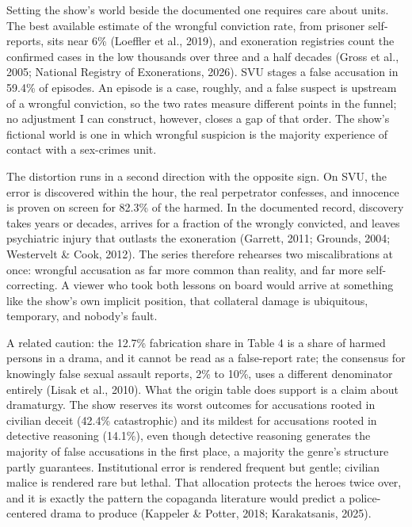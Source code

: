 \documentclass[
]{article}
\begin{document}
Setting the show's world beside the documented one requires care about
units. The best available estimate of the wrongful conviction rate, from
prisoner self-reports, sits near 6\% (Loeffler et al., 2019), and
exoneration registries count the confirmed cases in the low thousands
over three and a half decades (Gross et al., 2005; National Registry of
Exonerations, 2026). SVU stages a false accusation in 59.4\% of
episodes. An episode is a case, roughly, and a false suspect is upstream
of a wrongful conviction, so the two rates measure different points in
the funnel; no adjustment I can construct, however, closes a gap of that
order. The show's fictional world is one in which wrongful suspicion is
the majority experience of contact with a sex-crimes unit.

The distortion runs in a second direction with the opposite sign. On
SVU, the error is discovered within the hour, the real perpetrator
confesses, and innocence is proven on screen for 82.3\% of the harmed.
In the documented record, discovery takes years or decades, arrives for
a fraction of the wrongly convicted, and leaves psychiatric injury that
outlasts the exoneration (Garrett, 2011; Grounds, 2004; Westervelt \&
Cook, 2012). The series therefore rehearses two miscalibrations at once:
wrongful accusation as far more common than reality, and far more
self-correcting. A viewer who took both lessons on board would arrive at
something like the show's own implicit position, that collateral damage
is ubiquitous, temporary, and nobody's fault.

A related caution: the 12.7\% fabrication share in Table 4 is a share of
harmed persons in a drama, and it cannot be read as a false-report rate;
the consensus for knowingly false sexual assault reports, 2\% to 10\%,
uses a different denominator entirely (Lisak et al., 2010). What the
origin table does support is a claim about dramaturgy. The show reserves
its worst outcomes for accusations rooted in civilian deceit (42.4\%
catastrophic) and its mildest for accusations rooted in detective
reasoning (14.1\%), even though detective reasoning generates the
majority of false accusations in the first place, a majority the genre's
structure partly guarantees. Institutional error is rendered frequent
but gentle; civilian malice is rendered rare but lethal. That allocation
protects the heroes twice over, and it is exactly the pattern the
copaganda literature would predict a police-centered drama to produce
(Kappeler \& Potter, 2018; Karakatsanis, 2025).
\end{document}
